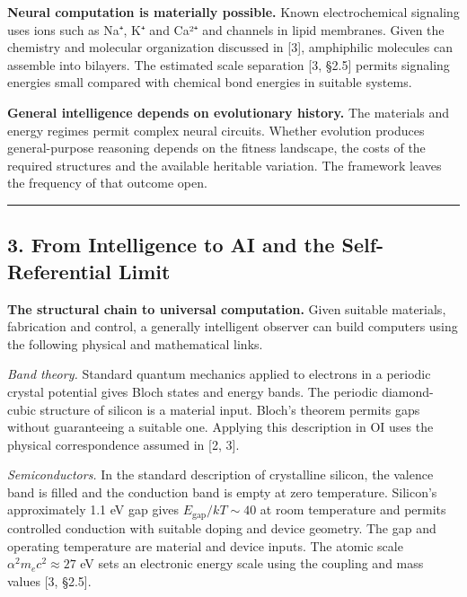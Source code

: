 \documentclass[
]{article}
\begin{document}
\textbf{Neural computation is materially possible.} Known
electrochemical signaling uses ions such as Na⁺, K⁺ and Ca²⁺ and
channels in lipid membranes. Given the chemistry and molecular
organization discussed in {[}3{]}, amphiphilic molecules can assemble
into bilayers. The estimated scale separation {[}3, §2.5{]} permits
signaling energies small compared with chemical bond energies in
suitable systems.

\textbf{General intelligence depends on evolutionary history.} The
materials and energy regimes permit complex neural circuits. Whether
evolution produces general-purpose reasoning depends on the fitness
landscape, the costs of the required structures and the available
heritable variation. The framework leaves the frequency of that outcome
open.

\begin{center}\rule{0.5\linewidth}{0.5pt}\end{center}

\hypertarget{from-intelligence-to-ai-and-the-self-referential-limit}{%
\subsection{3. From Intelligence to AI and the Self-Referential
Limit}\label{from-intelligence-to-ai-and-the-self-referential-limit}}

\textbf{The structural chain to universal computation.} Given suitable
materials, fabrication and control, a generally intelligent observer can
build computers using the following physical and mathematical links.

\emph{Band theory.} Standard quantum mechanics applied to electrons in a
periodic crystal potential gives Bloch states and energy bands. The
periodic diamond-cubic structure of silicon is a material input. Bloch's
theorem permits gaps without guaranteeing a suitable one. Applying this
description in OI uses the physical correspondence assumed in {[}2,
3{]}.

\emph{Semiconductors.} In the standard description of crystalline
silicon, the valence band is filled and the conduction band is empty at
zero temperature. Silicon's approximately 1.1 eV gap gives
\(E_{\text{gap}} / kT \sim 40\) at room temperature and permits
controlled conduction with suitable doping and device geometry. The gap
and operating temperature are material and device inputs. The atomic
scale \(\alpha^2 m_e c^2 \approx 27\) eV sets an electronic energy scale
using the coupling and mass values {[}3, §2.5{]}.
\end{document}
